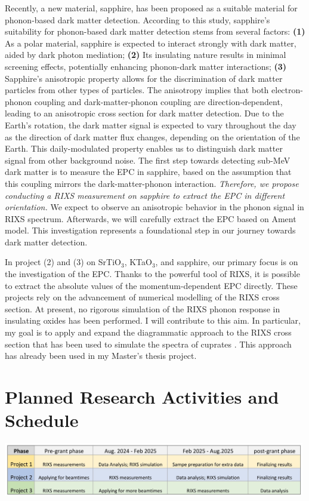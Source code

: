 \documentclass[11pt]{article}
\begin{document}
%
Recently, a new material, sapphire, has been proposed as a suitable material for phonon-based dark matter detection\cite{griffin_directional_2018}. According to this study, sapphire's suitability for phonon-based dark matter detection stems from several factors: 
\textbf{(1)} As a polar material, sapphire is  expected to interact strongly with dark matter, aided by dark photon mediation; 
\textbf{(2)} Its insulating nature results in minimal screening effects, potentially enhancing phonon-dark matter interactions; 
\textbf{(3)} Sapphire's anisotropic property allows for the discrimination of dark matter particles from other types of particles. 
The anisotropy implies that both electron-phonon coupling and dark-matter-phonon coupling are direction-dependent\cite{griffin_directional_2018}, leading to an anisotropic cross section for dark matter detection. 
Due to the Earth's rotation, the dark matter signal is expected to vary throughout the day as the direction of dark matter flux changes, depending on the orientation of the Earth. 
This daily-modulated property enables us to distinguish dark matter signal from other background noise.
The first step towards detecting sub-MeV dark matter is to measure the EPC in sapphire, based on the assumption that this coupling mirrors the dark-matter-phonon interaction. 
\textit{Therefore, we propose conducting a RIXS measurement on sapphire to extract the EPC in different orientation.}  
We expect to observe an anisotropic behavior in the phonon signal in RIXS spectrum. 
Afterwards, we will carefully extract the EPC based on Ament model\cite{ament_determining_2011}. 
This investigation represents a foundational step in our journey towards dark matter detection.

In project (2) and (3) on SrTiO$_{3}$, KTaO$_{3}$, and sapphire, our primary focus is on the investigation of the EPC. 
Thanks to the powerful tool of RIXS, it is possible to extract the absolute values of the momentum-dependent EPC directly. 
These projects rely on the advancement of numerical modelling of the RIXS cross section. At present, no rigorous simulation of the RIXS phonon response in insulating oxides has been performed. I will contribute to this aim. In particular, my goal is to apply and expand the diagrammatic approach to the RIXS cross section that has been used to simulate the spectra of cuprates \cite{devereaux_directly_2016}. This approach has already been used in my Master's thesis project.

\section{Planned Research Activities and Schedule}
\begin{center}
\includegraphics[width=0.99\textwidth]{figures/schedule.jpg}
\end{center}
\end{document}
